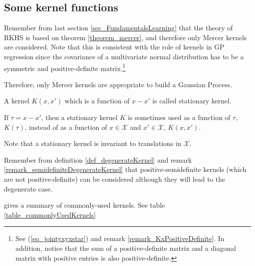 \subsection{Some kernel functions} %
\label{sec_kernels}

Remember from last section \ref{sec_FundamentalsLearning} that the theory of RKHS is based on theorem \ref{theorem_mercer}, and therefore only Mercer kernels are considered. Note that this is consistent with the role of kernels in GP regression since the covariance of a multivariate normal distribution has to be a symmetric and positive-definite matrix.\footnote{
See (\ref{eq_jointyxyxstar}) and remark \ref{remark_KxPositiveDefinite}. In addition, notice that the sum of a positive-definite matrix and a diagonal matrix with positive entries is also positive-definite. 
}

Therefore, only Mercer kernels are appropriate to build a Gaussian Process. 

\begin{definition}
  A kernel $K(x,x')$ which is a function of $x-x'$ is called stationary kernel.
\end{definition}

\begin{remark}
  If $\tau = x-x'$, then a stationary kernel $K$ is sometimes used as a function of $\tau$, $K(\tau)$, instead of as a function of $x \in \mathcal{X}$ and $x' \in \mathcal{X}$, $K(x,x')$.
\end{remark}

\begin{remark}
  Note that a stationary kernel is invariant to translations in $\mathcal{X}$.
\end{remark}

Remember from definition \ref{def_degenerateKernel} and remark \ref{remark_semidefiniteDegenerateKernel} that positive-semidefinite kernels (which are not positive-definite) can be considered although they will lead to the degenerate case. 

\textcite{rasmussen2006} gives a summary of commonly-used kernels. See table \ref{table_commonlyUsedKernels}


